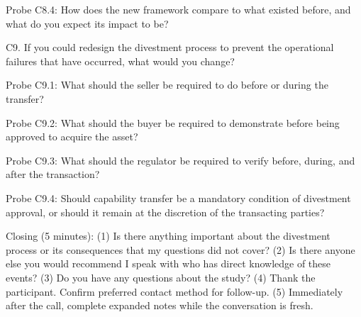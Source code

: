 Probe C8.4: How does the new framework compare to what existed before,
and what do you expect its impact to be?

C9. If you could redesign the divestment process to prevent the
operational failures that have occurred, what would you change?

Probe C9.1: What should the seller be required to do before or during
the transfer?

Probe C9.2: What should the buyer be required to demonstrate before
being approved to acquire the asset?

Probe C9.3: What should the regulator be required to verify before,
during, and after the transaction?

Probe C9.4: Should capability transfer be a mandatory condition of
divestment approval, or should it remain at the discretion of the
transacting parties?

Closing (5 minutes): (1) Is there anything important about the
divestment process or its consequences that my questions did not cover?
(2) Is there anyone else you would recommend I speak with who has direct
knowledge of these events? (3) Do you have any questions about the
study? (4) Thank the participant. Confirm preferred contact method for
follow-up. (5) Immediately after the call, complete expanded notes while
the conversation is fresh.
